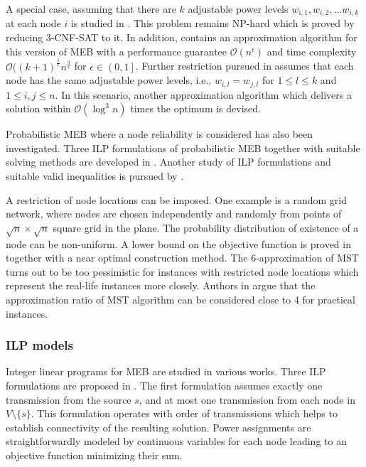A special case, assuming that there are $k$ adjustable power levels $w_{i,1},w_{i,2},\dots w_{i,k}$ at each node $i$ is studied in \cite{liang02}.
This problem remains NP-hard which is proved by reducing \textsc{3-CNF-SAT} to it.
In addition, \cite{liang02} contains an approximation algorithm for this version of MEB with a performance guarantee $\mathcal{O}(n^\epsilon)$ and 
time complexity $\mathcal{O}((k+1)^{\frac{1}{\epsilon}} n^{\frac{3}{\epsilon}}$ for $\epsilon\in \left(0,1\right]$.
Further restriction pursued in \cite{liang02} assumes that each node has the same adjustable power levels, i.e., $w_{i,l}=w_{j,l}$ for $1\leq l\leq k$ and $1\leq i,j\leq n$.
In this scenario, another approximation algorithm which delivers a solution within $\mathcal{O}(\log^3 n)$ times the optimum is devised.

Probabilistic MEB where a node reliability is considered has also been investigated.
Three ILP formulations of probabilistic MEB together with suitable solving methods are developed in \cite{montemanni08}.
Another study of ILP formulations and suitable valid inequalities is pursued by \cite{barta10}.

A restriction of node locations can be imposed.
One example is a random grid network, where nodes are chosen independently and randomly from points of $\sqrt{n}\times\sqrt{n}$ square grid in the plane.
The probability distribution of existence of a node can be non-uniform.
A lower bound on the objective function is proved in \cite{calamoneri08} together with a near optimal construction method.
The 6-approximation of MST turns out to be too pessimistic for instances with restricted node locations which represent the real-life instances more closely.
Authors in \cite{flammini07} argue that the approximation ratio of MST algorithm can be considered close to 4 for practical instances.

\subsubsection{ILP models}

Integer linear programs for MEB are studied in various works.
Three ILP formulations are proposed in \cite{das03}.
The first formulation assumes exactly one transmission from the source $s$, and at most one transmission from each node in $V\setminus\{s\}$.
This formulation operates with order of transmissions which helps to establish connectivity of the resulting solution.
Power assignments are straightforwardly modeled by continuous variables for each node leading to an objective function minimizing their sum.

